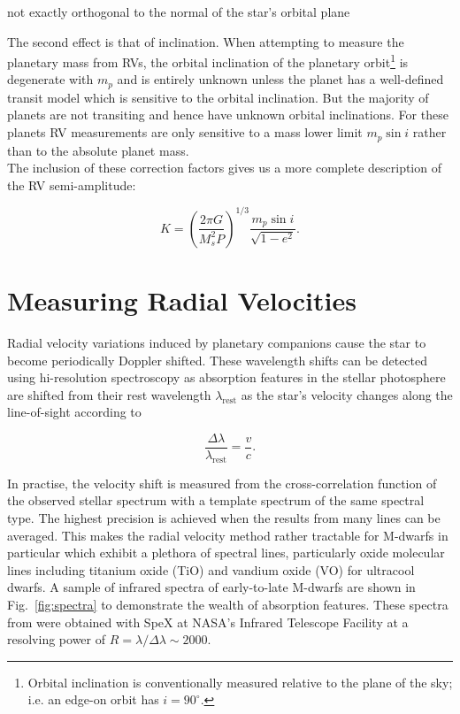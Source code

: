 not exactly orthogonal to the normal of the  star's orbital plane 

The second effect is that of inclination. When attempting to measure the planetary 
mass from RVs, the orbital inclination of the planetary orbit\footnote{Orbital 
inclination is conventionally measured  relative 
to the plane of the sky; i.e. an edge-on orbit has $i=90^{\circ}$.} is degenerate with
$m_p$ and is entirely unknown unless the planet has a well-defined transit model which is sensitive
to the orbital inclination. But the majority of planets are not transiting and hence have unknown
orbital inclinations. For these planets RV measurements 
are only sensitive to a mass lower limit $m_p\sin{i}$ rather than to the absolute planet mass. \\

The inclusion of these correction factors gives us 
a more complete description of the RV semi-amplitude: 

\begin{equation}
K = \left( \frac{2\pi G}{M_s^2 P} \right)^{1/3} \frac{m_p \sin{i}}{\sqrt{1-e^2}}. 
\label{eq:K2}
\end{equation}

\section{Measuring Radial Velocities} \label{sect:spectrograph}
Radial velocity variations induced by planetary companions cause the star to become 
periodically Doppler shifted. These wavelength shifts can be detected using hi-resolution 
spectroscopy as absorption features in the stellar photosphere are shifted from their 
rest wavelength $\lambda_{\mathrm{rest}}$ as the star's velocity changes along the line-of-sight 
according to 

\begin{equation}
\frac{\Delta \lambda}{\lambda_{\mathrm{rest}}} = \frac{v}{c}.
\end{equation}

\noindent In practise, the velocity shift is measured from the cross-correlation function of 
the observed stellar spectrum with a template spectrum of the same spectral type. The highest 
precision is achieved when the results from many lines can be averaged. This makes the radial 
velocity method rather tractable for M-dwarfs in particular which exhibit a plethora of 
spectral lines, particularly oxide molecular lines including titanium oxide (TiO) and vandium 
oxide (VO) for ultracool dwarfs. A sample of infrared spectra of early-to-late M-dwarfs 
are shown in Fig.~\ref{fig:spectra} to demonstrate the wealth of absorption features. 
These spectra from \cite{rayner09} were obtained 
with SpeX at NASA's Infrared Telescope Facility at a resolving power of 
$R=\lambda / \Delta \lambda \sim 2000$. \\ 

